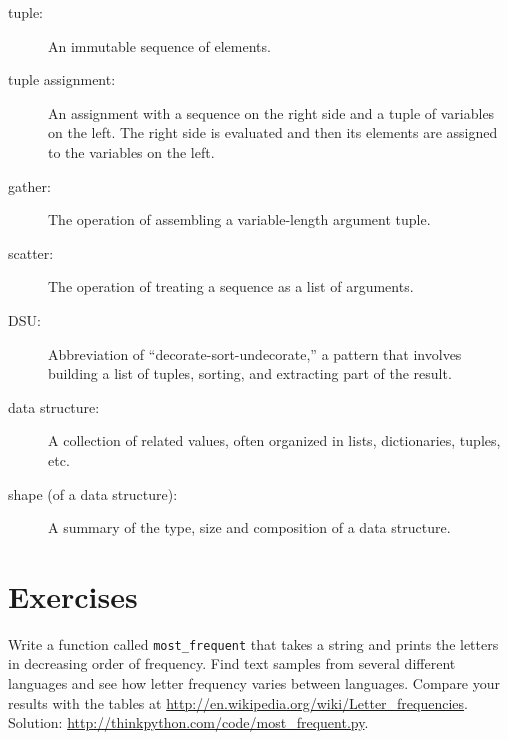\documentclass[10pt]{book}
\begin{document}
\begin{description}

\item[tuple:] An immutable sequence of elements.

\item[tuple assignment:] An assignment with a sequence on the
right side and a tuple of variables on the left.  The right
side is evaluated and then its elements are assigned to the
variables on the left.

\item[gather:] The operation of assembling a variable-length
argument tuple.

\item[scatter:] The operation of treating a sequence as a list of
arguments.

\item[DSU:] Abbreviation of ``decorate-sort-undecorate,'' a
pattern that involves building a list of tuples, sorting, and
extracting part of the result.

\item[data structure:] A collection of related values, often
organized in lists, dictionaries, tuples, etc.

\item[shape (of a data structure):] A summary of the type,
size and composition of a data structure.

\end{description}


\section{Exercises}

\begin{exercise}

Write a function called \verb"most_frequent" that takes a string and
prints the letters in decreasing order of frequency.  Find text
samples from several different languages and see how letter frequency
varies between languages.  Compare your results with the tables at
\url{http://en.wikipedia.org/wiki/Letter_frequencies}.  Solution:
\url{http://thinkpython.com/code/most_frequent.py}.   

\end{exercise}
\end{document}
